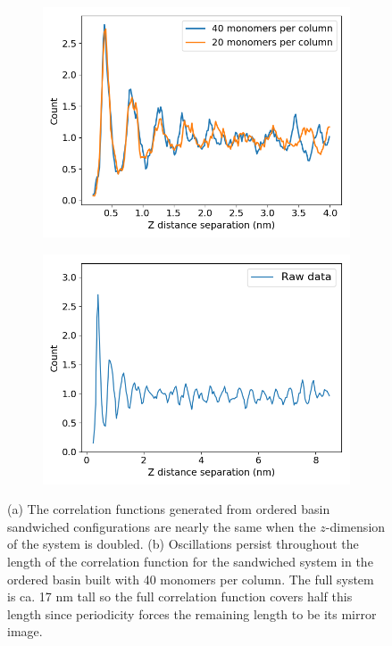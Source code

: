 \documentclass{article}
\begin{document}
  \begin{figure}[!htb]
  \centering
  \begin{subfigure}{0.45\textwidth}
  \includegraphics[width=\textwidth]{z_correlation_overlay.png}
  \caption{}\label{fig:z_correlation_overlay}
  \end{subfigure}
  \begin{subfigure}{0.45\textwidth}
  \includegraphics[width=\textwidth]{tall_correlation_full.png}
  \caption{}\label{fig:tall_correlation_full}
  \end{subfigure}
  \caption{(a) The correlation functions generated from ordered basin sandwiched 
  configurations are nearly the same when the $z$-dimension of the system is doubled.
  (b) Oscillations persist throughout the length of the correlation function for the
  sandwiched system in the ordered basin built with 40 monomers per column. The full
  system is ca. 17 nm tall so the full correlation function covers half this length
  since periodicity forces the remaining length to be its mirror image.}\label{fig:correlation_functions}
  \end{figure}
  
\end{document}
